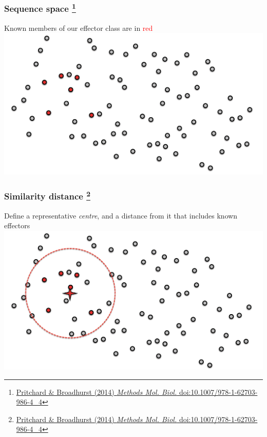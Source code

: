 \begin{frame}
  \frametitle{Sequence space
  \footnote{\tiny{\href{http://dx.doi.org/10.1007/978-1-62703-986-4_4}{Pritchard \& Broadhurst (2014) \textit{Methods Mol. Biol.} doi:10.1007/978-1-62703-986-4\_4}}}
}
  Known members of our effector class are in \textcolor{red}{red} \vspace{0.5cm}
  \includegraphics[width=1\textwidth,valign=b]{images/finding_effectors1}    
\end{frame}

\begin{frame}
  \frametitle{Similarity distance
  \footnote{\tiny{\href{http://dx.doi.org/10.1007/978-1-62703-986-4_4}{Pritchard \& Broadhurst (2014) \textit{Methods Mol. Biol.} doi:10.1007/978-1-62703-986-4\_4}}}
}
  Define a representative \textcolor{hutton_green}{\textit{centre}}, and a \textcolor{hutton_blue}{distance} from it that includes known effectors \vspace{0.5cm}
  \includegraphics[width=1\textwidth,valign=b]{images/finding_effectors2}    
\end{frame}

